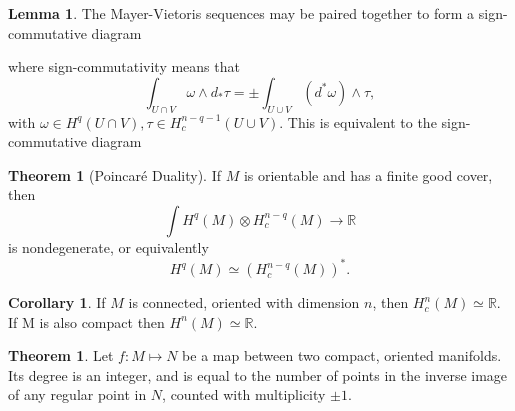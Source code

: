 \documentclass[twocolumn]{article}
\theoremstyle{definition}
\newtheorem{theorem}[definition]{Theorem}
\newtheorem{lemma}[definition]{Lemma}
\newtheorem{corollary}[definition]{Corollary}
\theoremstyle{remark}
\begin{document}
\begin{lemma}
    The Mayer-Vietoris sequences may be paired together to form a sign-commutative diagram
    \begin{center}
    \end{center}
    where sign-commutativity means that
    \begin{equation}
        \int_{U\cap V} \omega\wedge d_* \tau = \pm \int_{U \cup V}(d^*\omega)\wedge \tau,
    \end{equation}
    with $\omega \in H^q(U\cap V), \tau \in H_c^{n-q-1}(U\cup V)$.
    This is equivalent to the sign-commutative diagram
    \begin{center}
    \end{center}
\end{lemma}
\begin{theorem}[Poincaré Duality]
    If $M$ is orientable and has a finite good cover, then
    \begin{equation}
        \int H^q(M) \otimes H_c^{n-q}(M) \rightarrow \mathbb{R}
    \end{equation}
    is nondegenerate, or equivalently
    \begin{equation}
        H^q(M) \simeq (H_c^{n-q}(M))^*.
    \end{equation}
\end{theorem}
\begin{corollary}
    If $M$ is connected, oriented with dimension $n$, then $H^n_c(M) \simeq \mathbb{R}$.
    If M is also compact then $H^n(M) \simeq \mathbb{R}$.
\end{corollary}
\begin{theorem}
    Let $f: M \mapsto N$ be a map between two compact, oriented manifolds. Its degree is an integer, and is equal to the number of points in the inverse image of any regular point in $N$, counted with multiplicity $\pm 1$.
\end{theorem}
\end{document}
